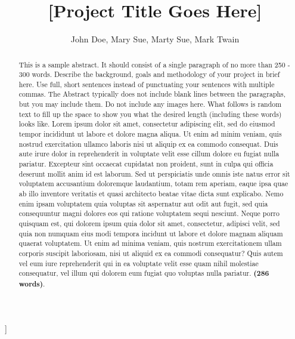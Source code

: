 \documentclass[ 12pt,a4paper,twocolumn,fleqn]{article}
\begin{document}
\begin{@twocolumnfalse}
\title {[Project Title Goes Here]}
\author{John Doe, Mary Sue, Marty Sue, Mark Twain}
\maketitle
\begin{abstract}
This is a sample abstract. It should consist of a single paragraph of no more than 250 - 300 words. Describe the background, goals and methodology of your project in brief here. Use full, short sentences instead of punctuating your sentences with multiple commas. The Abstract typically does not include blank lines between the paragraphs, but you may include them. Do not include any images here. What follows is random text to fill up the space to show you what the desired length (including these words) looks like.  Lorem ipsum dolor sit amet, consectetur adipiscing elit, sed do eiusmod tempor incididunt ut labore et dolore magna aliqua. Ut enim ad minim veniam, quis nostrud exercitation ullamco laboris nisi ut aliquip ex ea commodo consequat. Duis aute irure dolor in reprehenderit in voluptate velit esse cillum dolore eu fugiat nulla pariatur. Excepteur sint occaecat cupidatat non proident, sunt in culpa qui officia deserunt mollit anim id est laborum. Sed ut perspiciatis unde omnis iste natus error sit voluptatem accusantium doloremque laudantium, totam rem aperiam, eaque ipsa quae ab illo inventore veritatis et quasi architecto beatae vitae dicta sunt explicabo. Nemo enim ipsam voluptatem quia voluptas sit aspernatur aut odit aut fugit, sed quia consequuntur magni dolores eos qui ratione voluptatem sequi nesciunt. Neque porro quisquam est, qui dolorem ipsum quia dolor sit amet, consectetur, adipisci velit, sed quia non numquam eius modi tempora incidunt ut labore et dolore magnam aliquam quaerat voluptatem. Ut enim ad minima veniam, quis nostrum exercitationem ullam corporis suscipit laboriosam, nisi ut aliquid ex ea commodi consequatur? Quis autem vel eum iure reprehenderit qui in ea voluptate velit esse quam nihil molestiae consequatur, vel illum qui dolorem eum fugiat quo voluptas nulla pariatur. \textbf{(286 words)}.
\end{abstract}
\end{@twocolumnfalse}]
\linenumbers
\modulolinenumbers[5]
\onecolumn
\newpage
  \pagestyle{fancy}
\thisfancypage{%
  \setlength{\fboxsep}{20pt}\doublebox}{}
\tableofcontents
\newpage
  \pagestyle{fancy}
\thisfancypage{%
  \setlength{\fboxsep}{20pt}\doublebox}{}
\end{document}
